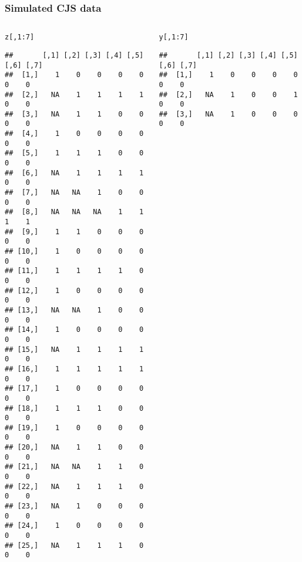 \documentclass[color=usenames,dvipsnames]{beamer}\usepackage[]{graphicx}\usepackage[]{color}
\makeatletter
\newcommand{\hlnum}[1]{\textcolor[rgb]{0.69,0.494,0}{#1}}%
\newcommand{\hlopt}[1]{\textcolor[rgb]{0,0,0}{#1}}%
\newcommand{\hlstd}[1]{\textcolor[rgb]{0,0,0}{#1}}%
\newenvironment{kframe}{%
 \def\at@end@of@kframe{}%
 \ifinner\ifhmode%
  \def\at@end@of@kframe{\end{minipage}}%
  \begin{minipage}{\columnwidth}%
 \fi\fi%
 \def\FrameCommand##1{\hskip\@totalleftmargin \hskip-\fboxsep
 \colorbox{shadecolor}{##1}\hskip-\fboxsep
     \hskip-\linewidth \hskip-\@totalleftmargin \hskip\columnwidth}%
 \MakeFramed {\advance\hsize-\width
   \@totalleftmargin\z@ \linewidth\hsize
   \@setminipage}}%
 {\par\unskip\endMakeFramed%
 \at@end@of@kframe}
\newenvironment{knitrout}{}{} %
\makeatother
\begin{document}
\begin{frame}[fragile]
  \frametitle{Simulated CJS data}
  \begin{columns}
    \tiny
    \begin{column}{0.5\textwidth}
\begin{knitrout}
\color{fgcolor}\begin{kframe}
\begin{alltt}
\hlstd{z[,}\hlnum{1}\hlopt{:}\hlnum{7}\hlstd{]}
\end{alltt}
\begin{verbatim}
##       [,1] [,2] [,3] [,4] [,5] [,6] [,7]
##  [1,]    1    0    0    0    0    0    0
##  [2,]   NA    1    1    1    1    0    0
##  [3,]   NA    1    1    0    0    0    0
##  [4,]    1    0    0    0    0    0    0
##  [5,]    1    1    1    0    0    0    0
##  [6,]   NA    1    1    1    1    0    0
##  [7,]   NA   NA    1    0    0    0    0
##  [8,]   NA   NA   NA    1    1    1    1
##  [9,]    1    1    0    0    0    0    0
## [10,]    1    0    0    0    0    0    0
## [11,]    1    1    1    1    0    0    0
## [12,]    1    0    0    0    0    0    0
## [13,]   NA   NA    1    0    0    0    0
## [14,]    1    0    0    0    0    0    0
## [15,]   NA    1    1    1    1    0    0
## [16,]    1    1    1    1    1    0    0
## [17,]    1    0    0    0    0    0    0
## [18,]    1    1    1    0    0    0    0
## [19,]    1    0    0    0    0    0    0
## [20,]   NA    1    1    0    0    0    0
## [21,]   NA   NA    1    1    0    0    0
## [22,]   NA    1    1    1    0    0    0
## [23,]   NA    1    0    0    0    0    0
## [24,]    1    0    0    0    0    0    0
## [25,]   NA    1    1    1    0    0    0
\end{verbatim}
\end{kframe}
\end{knitrout}
    \end{column}
    \begin{column}{0.5\textwidth}
\begin{knitrout}
\color{fgcolor}\begin{kframe}
\begin{alltt}
\hlstd{y[,}\hlnum{1}\hlopt{:}\hlnum{7}\hlstd{]}
\end{alltt}
\begin{verbatim}
##       [,1] [,2] [,3] [,4] [,5] [,6] [,7]
##  [1,]    1    0    0    0    0    0    0
##  [2,]   NA    1    0    0    1    0    0
##  [3,]   NA    1    0    0    0    0    0

\end{verbatim}
\end{kframe}
\end{knitrout}
\end{column}
\end{columns}
\end{frame}
\end{document}
